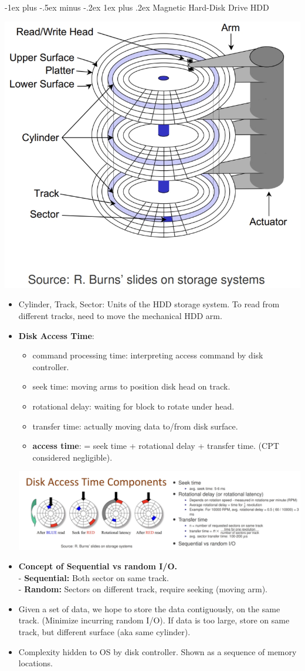\documentclass[10pt, landscape]{article}
\makeatletter
\renewcommand{\subsubsection}{\@startsection{subsubsection}{3}{0mm}%
                                {-1ex plus -.5ex minus -.2ex}%
                                {1ex plus .2ex}%
                                {\normalfont\small\bfseries}}
\makeatother
\begin{document}
\begin{multicols*}{3}
\subsubsection{Magnetic Hard-Disk Drive HDD}
\centerline{\includegraphics[width = 0.5\linewidth]{HDD}}
\begin{itemize}
\item Cylinder, Track, Sector: Units of the HDD storage system. To read from different tracks, need to move the mechanical HDD arm.
\item \textbf{Disk Access Time}:
	\begin{itemize}
		\item command processing time: interpreting access command by disk controller.
		\item seek time: moving arms to position disk head on track.
		\item rotational delay: waiting for block to rotate under head.
		\item transfer time: actually moving data to/from disk surface.
		\item \textbf{access time}: = seek time + rotational delay + transfer time. (CPT considered negligible). 
	\end{itemize}
\centerline{\includegraphics[width = 1\linewidth]{diskAccessTime}}
\item \textbf{Concept of Sequential vs random I/O.} \\
- \textbf{Sequential:} Both sector on same track. \\
- \textbf{Random:} Sectors on different track, require seeking (moving arm).
\item Given a set of data, we hope to store the data contiguously, on the same track. (Minimize incurring random I/O). If data is too large, store on same track, but different surface (aka same cylinder).
\item Complexity hidden to OS by disk controller. Shown as a sequence of memory locations.
\end{itemize}


\end{multicols*}
\end{document}
